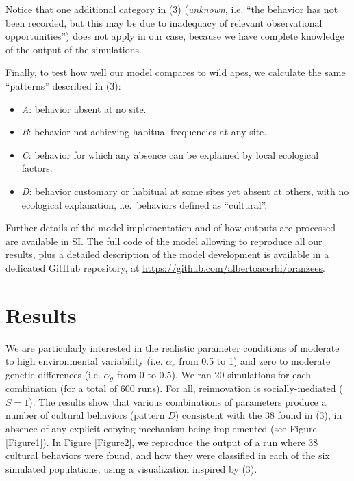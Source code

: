 \documentclass[9pt,twocolumn,twoside,]{pnas-new}
\begin{document}
Notice that one additional category in (3) (\emph{unknown}, i.e. ``the
behavior has not been recorded, but this may be due to inadequacy of
relevant observational opportunities'') does not apply in our case,
because we have complete knowledge of the output of the simulations.

Finally, to test how well our model compares to wild apes, we calculate
the same ``patterns'' described in (3):

\begin{itemize}
\item
  \emph{A}: behavior absent at no site.
\item
  \emph{B}: behavior not achieving habitual frequencies at any site.
\item
  \emph{C}: behavior for which any absence can be explained by local
  ecological factors.
\item
  \emph{D}: behavior customary or habitual at some sites yet absent at
  others, with no ecological explanation, i.e.~behaviors defined as
  ``cultural''.
\end{itemize}

Further details of the model implementation and of how outputs are
processed are available in SI. The full code of the model allowing to
reproduce all our results, plus a detailed description of the model
development is available in a dedicated GitHub repository, at
\url{https://github.com/albertoacerbi/oranzees}.

\section*{Results}\label{results}

We are particularly interested in the realistic parameter conditions of
moderate to high environmental variability (i.e. \(\alpha_e\) from 0.5
to 1) and zero to moderate genetic differences (i.e. \(\alpha_g\) from 0
to 0.5). We ran 20 simulations for each combination (for a total of 600
runs). For all, reinnovation is socially-mediated (\(S=1\)). The results
show that various combinations of parameters produce a number of
cultural behaviors (pattern \emph{D}) consistent with the 38 found in
(3), in absence of any explicit copying mechanism being implemented (see
Figure \ref{Figure1}). In Figure \ref{Figure2}, we reproduce the output
of a run where 38 cultural behaviors were found, and how they were
classified in each of the six simulated populations, using a
visualization inspired by (3).
\end{document}
